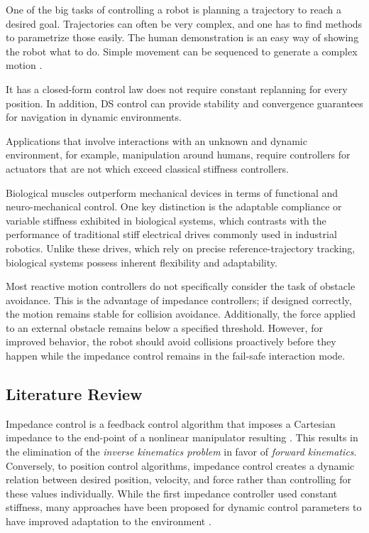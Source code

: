 \documentclass[conference]{IEEEtran}
\begin{document}
One of the big tasks of controlling a robot is planning a trajectory to reach a desired goal. Trajectories can often be very complex, and one has to find methods to parametrize those easily. The human demonstration is an easy way of showing the robot what to do. Simple movement can be sequenced to generate a complex motion \cite{gribovskaya2011motion}.

It has a closed-form control law does not require constant replanning for every position. In addition, DS control can provide stability and convergence guarantees for navigation in dynamic environments.

Applications that involve interactions with an unknown and dynamic environment, for example, manipulation around humans, require controllers for actuators that are not which exceed classical stiffness controllers.

Biological muscles outperform mechanical devices in terms of functional and neuro-mechanical control. One key distinction is the adaptable compliance or variable stiffness exhibited in biological systems, which contrasts with the performance of traditional stiff electrical drives commonly used in industrial robotics. Unlike these drives, which rely on precise reference-trajectory tracking, biological systems possess inherent flexibility and adaptability.

Most reactive motion controllers do not specifically consider the task of obstacle avoidance. This is the advantage of impedance controllers; if designed correctly, the motion remains stable for collision avoidance. Additionally, the force applied to an external obstacle remains below a specified threshold. 
However, for improved behavior, the robot should avoid collisions proactively before they happen while the impedance control remains in the fail-safe interaction mode.



\subsection{Literature Review}
\cite{takegaki1981new}
Impedance control is a feedback control algorithm that imposes a Cartesian impedance to the end-point of a nonlinear manipulator resulting \cite{hogan1985impedance}. This results in the elimination of the \textit{inverse kinematics problem} in favor of \textit{forward kinematics}.
Conversely, to position control algorithms, impedance control creates a dynamic relation between desired position, velocity, and force rather than controlling for these values individually.   
While the first impedance controller used constant stiffness, many approaches have been proposed for dynamic control parameters to have improved adaptation to the environment \cite{vanderborght2013variable, abu2020variable}. 
\end{document}
